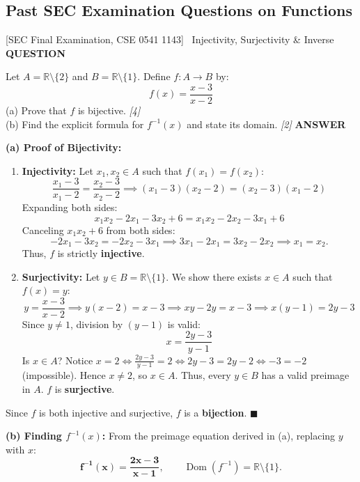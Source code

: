 \documentclass[11pt,a4paper]{article}
\newcommand{\Qlabel}{\textbf{\color{navy}\footnotesize\MakeUppercase{Question}}\par\smallskip}
\newcommand{\Alabel}{\textbf{\color{teal}\footnotesize\MakeUppercase{Answer}}\par\smallskip}
\begin{document}
\subsection{Past SEC Examination Questions on Functions}

\begin{exambox}{[SEC Final Examination, CSE 0541 1143] \ Injectivity, Surjectivity \& Inverse}
\Qlabel
Let $A = \mathbb{R} \setminus \{2\}$ and $B = \mathbb{R} \setminus \{1\}$. Define $f: A \to B$ by:
\[
f(x) = \frac{x - 3}{x - 2}
\]
(a) Prove that $f$ is bijective. \hfill\textit{[4]}\\
(b) Find the explicit formula for $f^{-1}(x)$ and state its domain. \hfill\textit{[2]}
\tcblower
\Alabel
\textbf{(a) Proof of Bijectivity:}
\begin{enumerate}
    \item \textbf{Injectivity:} Let $x_1, x_2 \in A$ such that $f(x_1) = f(x_2)$:
    \[
    \frac{x_1 - 3}{x_1 - 2} = \frac{x_2 - 3}{x_2 - 2} \implies (x_1 - 3)(x_2 - 2) = (x_2 - 3)(x_1 - 2)
    \]
    Expanding both sides:
    \[
    x_1 x_2 - 2x_1 - 3x_2 + 6 = x_1 x_2 - 2x_2 - 3x_1 + 6
    \]
    Canceling $x_1 x_2 + 6$ from both sides:
    \[
    -2x_1 - 3x_2 = -2x_2 - 3x_1 \implies 3x_1 - 2x_1 = 3x_2 - 2x_2 \implies x_1 = x_2.
    \]
    Thus, $f$ is strictly \textbf{injective}.
    
    \item \textbf{Surjectivity:} Let $y \in B = \mathbb{R} \setminus \{1\}$. We show there exists $x \in A$ such that $f(x) = y$:
    \[
    y = \frac{x - 3}{x - 2} \implies y(x - 2) = x - 3 \implies xy - 2y = x - 3 \implies x(y - 1) = 2y - 3
    \]
    Since $y \neq 1$, division by $(y - 1)$ is valid:
    \[
    x = \frac{2y - 3}{y - 1}
    \]
    Is $x \in A$? Notice $x = 2 \iff \frac{2y-3}{y-1} = 2 \iff 2y-3 = 2y-2 \iff -3 = -2$ (impossible). Hence $x \neq 2$, so $x \in A$.
    Thus, every $y \in B$ has a valid preimage in $A$. $f$ is \textbf{surjective}.
\end{enumerate}
Since $f$ is both injective and surjective, $f$ is a \textbf{bijection}. $\blacksquare$

\medskip
\textbf{(b) Finding $f^{-1}(x)$:}
From the preimage equation derived in (a), replacing $y$ with $x$:
\[
\mathbf{f^{-1}(x) = \frac{2x - 3}{x - 1}}, \qquad \operatorname{Dom}(f^{-1}) = \mathbb{R} \setminus \{1\}.
\]
\end{exambox}
\end{document}
